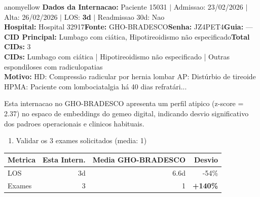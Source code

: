 \documentclass[a4paper,10pt]{article}
\begin{document}
\begin{anomalycard}[Internacao 118191 | GHO-BRADESCO | MODERADO (z=2.37)]{anomyellow}
\textbf{Dados da Internacao:} Paciente 15031 $\mid$ Admissao: 23/02/2026 $\mid$ Alta: 26/02/2026 $\mid$ LOS: \textbf{3d} $\mid$ Readmissao 30d: Nao\\
\textbf{Hospital:} Hospital 32917\quad\textbf{Fonte:} GHO-BRADESCO\quad\textbf{Senha:} JZ4PET4\quad\textbf{Guia:} ---\\
\textbf{CID Principal:} {\small Lumbago com ciática, Hipotireoidismo não especificado}\quad\textbf{Total CIDs:} 3\\

\textbf{CIDs:} {\scriptsize Lumbago com ciática | Hipotireoidismo não especificado | Outras espondiloses com radiculopatias}\\

\textbf{Motivo:} {\scriptsize HD: Compressão radicular por hernia lombar  AP: Distúrbio de tireoide   HPMA: Paciente com lombociatalgia há 40 dias refratári...}\\

\vspace{2pt}\begin{tcolorbox}[colback=severityred!20,colframe=anomyellow,title={\textbf{Interpretacao de Negocio}},fonttitle=\bfseries\small,left=4pt,right=4pt,top=3pt,bottom=3pt]
{\small Esta internacao no GHO-BRADESCO apresenta um perfil atipico (z-score = 2.37) no espaco de embeddings do gemeo digital, indicando desvio significativo dos padroes operacionais e clinicos habituais.}
\end{tcolorbox}
\begin{tcolorbox}[colback=severityyellow!30,colframe=anomorange,title={\textbf{Recomendacoes Especificas}},fonttitle=\bfseries\small,left=4pt,right=4pt,top=3pt,bottom=3pt]
\begin{enumerate}[nosep,leftmargin=16pt]
\item {\small Validar os 3 exames solicitados (media: 1)}
\end{enumerate}
\end{tcolorbox}
\begin{center}\begin{tabular}{l r r r}\toprule\textbf{Metrica} & \textbf{Esta Intern.} & \textbf{Media GHO-BRADESCO} & \textbf{Desvio} \\\midrule
LOS & 3d & 6.6d & -54\% \\
Exames & 3 & 1 & \textcolor{anomred}{\textbf{+140\%}} \\
\bottomrule\end{tabular}\end{center}


\end{anomalycard}
\end{document}
